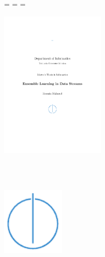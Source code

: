 \begin{titlepage}
  \oddsidemargin=\evensidemargin\relax
  \textwidth=\dimexpr{}\evensidemargin-2in\relax
  \hsize=\textwidth\relax

  \centering

  \vspace*{10mm}
  \includegraphics[width=50mm]{logo/tum}

  \vspace{10mm}
  {\Huge \textsc{\faculty{}}}\\

  \vspace{5mm}
  {\huge \scshape{\university{}}}\\

  \vspace{30mm}
  {\Large \doctype{}}

  \vspace{30mm}
  {\huge\bfseries \thesisTitle{}}

  \vspace{25mm}
  {\LARGE \thesisAuthor{}}

  \vspace{30mm}
  \includegraphics[width=30mm]{logo/faculty}
\end{titlepage}
